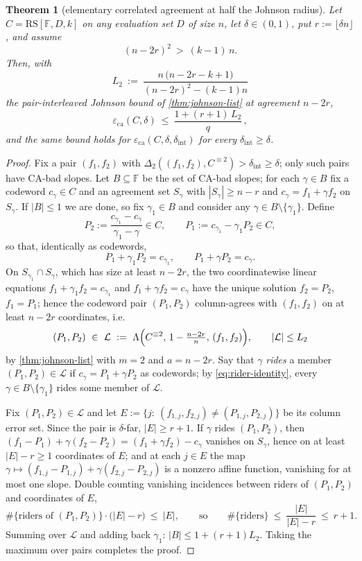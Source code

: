 \documentclass[11pt]{article}
\newtheorem{theorem}{Theorem}[section]
\theoremstyle{definition}
\theoremstyle{remark}
\newcommand{\F}{\mathbb{F}}
\newcommand{\RS}{\mathrm{RS}}
\newcommand{\eca}{\varepsilon_{\mathrm{ca}}}
\newcommand{\dist}{\Delta}
\newcommand{\Lst}{\Lambda}
\begin{document}
\begin{theorem}[elementary correlated agreement at half the Johnson radius]\label{thm:elementary-ca}
Let $C=\RS[\F,D,k]$ on any evaluation set $D$ of size $n$, let $\delta\in(0,1)$, put $r:=\lfloor\delta n\rfloor$, and assume
\[
(n-2r)^2\ >\ (k-1)\,n .
\]
Then, with
\[
L_2\ :=\ \frac{n\,\bigl(n-2r-k+1\bigr)}{(n-2r)^2-(k-1)n}
\]
the pair-interleaved Johnson bound of \cref{thm:johnson-list} at agreement $n-2r$,
\[
\eca(C,\delta)\ \le\ \frac{1+(r+1)\,L_2}{q}\,,
\]
and the same bound holds for $\eca(C,\delta,\delta_{\mathrm{int}})$ for every $\delta_{\mathrm{int}}\ge\delta$.
\end{theorem}

\begin{proof}
Fix a pair $(f_1,f_2)$ with $\dist_2((f_1,f_2),C^{\equiv2})>\delta_{\mathrm{int}}\ge\delta$; only such pairs have CA-bad slopes. Let $B\subseteq\F$ be the set of CA-bad slopes; for each $\gamma\in B$ fix a codeword $c_\gamma\in C$ and an agreement set $S_\gamma$ with $|S_\gamma|\ge n-r$ and $c_\gamma=f_1+\gamma f_2$ on $S_\gamma$. If $|B|\le1$ we are done, so fix $\gamma_1\in B$ and consider any $\gamma\in B\setminus\{\gamma_1\}$. Define
\[
P_2:=\frac{c_{\gamma_1}-c_{\gamma}}{\gamma_1-\gamma}\in C,
\qquad
P_1:=c_{\gamma_1}-\gamma_1P_2\in C,
\]
so that, identically as codewords,
\begin{equation}\label{eq:rider-identity}
P_1+\gamma_1P_2=c_{\gamma_1},
\qquad
P_1+\gamma P_2=c_{\gamma}.
\end{equation}
On $S_{\gamma_1}\cap S_{\gamma}$, which has size at least $n-2r$, the two coordinatewise linear equations $f_1+\gamma_1f_2=c_{\gamma_1}$ and $f_1+\gamma f_2=c_{\gamma}$ have the unique solution $f_2=P_2$, $f_1=P_1$; hence the codeword pair $(P_1,P_2)$ column-agrees with $(f_1,f_2)$ on at least $n-2r$ coordinates, i.e.
\[
(P_1,P_2)\ \in\ \mathcal L\ :=\ \Lst\Bigl(C^{\equiv2},\,1-\tfrac{n-2r}{n},\,(f_1,f_2)\Bigr),
\qquad
|\mathcal L|\le L_2
\]
by \cref{thm:johnson-list} with $m=2$ and $a=n-2r$. Say that $\gamma$ \emph{rides} a member $(P_1,P_2)\in\mathcal L$ if $c_\gamma=P_1+\gamma P_2$ as codewords; by \eqref{eq:rider-identity}, every $\gamma\in B\setminus\{\gamma_1\}$ rides some member of $\mathcal L$.

Fix $(P_1,P_2)\in\mathcal L$ and let $E:=\{j:\ (f_{1,j},f_{2,j})\ne(P_{1,j},P_{2,j})\}$ be its column error set. Since the pair is $\delta$-far, $|E|\ge r+1$. If $\gamma$ rides $(P_1,P_2)$, then $(f_1-P_1)+\gamma(f_2-P_2)=(f_1+\gamma f_2)-c_\gamma$ vanishes on $S_\gamma$, hence on at least $|E|-r\ge1$ coordinates of $E$; and at each $j\in E$ the map $\gamma\mapsto(f_{1,j}-P_{1,j})+\gamma(f_{2,j}-P_{2,j})$ is a nonzero affine function, vanishing for at most one slope. Double counting vanishing incidences between riders of $(P_1,P_2)$ and coordinates of $E$,
\[
\#\{\text{riders of }(P_1,P_2)\}\cdot\bigl(|E|-r\bigr)\ \le\ |E|,
\qquad\text{so}\qquad
\#\{\text{riders}\}\ \le\ \frac{|E|}{|E|-r}\ \le\ r+1 .
\]
Summing over $\mathcal L$ and adding back $\gamma_1$: $|B|\le1+(r+1)L_2$. Taking the maximum over pairs completes the proof.
\end{proof}
\end{document}
